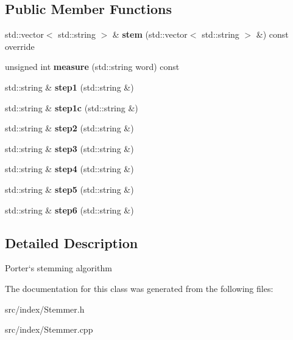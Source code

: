 \subsection*{Public Member Functions}
\begin{DoxyCompactItemize}
\item 
std\+::vector$<$ std\+::string $>$ \& {\bfseries stem} (std\+::vector$<$ std\+::string $>$ \&) const override\hypertarget{classStemmer_ae058747c8ba219324631ddd0e7258d9e}{}\label{classStemmer_ae058747c8ba219324631ddd0e7258d9e}

\item 
unsigned int {\bfseries measure} (std\+::string word) const \hypertarget{classStemmer_a221809125f65c5c3154fa4c482e39f9b}{}\label{classStemmer_a221809125f65c5c3154fa4c482e39f9b}

\item 
std\+::string \& {\bfseries step1} (std\+::string \&)\hypertarget{classStemmer_a8a77a75e099f66edcafbbdb6b6b824c4}{}\label{classStemmer_a8a77a75e099f66edcafbbdb6b6b824c4}

\item 
std\+::string \& {\bfseries step1c} (std\+::string \&)\hypertarget{classStemmer_a8b84eb574cf401df2530aab31b234b8b}{}\label{classStemmer_a8b84eb574cf401df2530aab31b234b8b}

\item 
std\+::string \& {\bfseries step2} (std\+::string \&)\hypertarget{classStemmer_ad68bf0a9c083172fc928598171eee393}{}\label{classStemmer_ad68bf0a9c083172fc928598171eee393}

\item 
std\+::string \& {\bfseries step3} (std\+::string \&)\hypertarget{classStemmer_a4dc45e7fd247a8490d2dbf7e31bc75f2}{}\label{classStemmer_a4dc45e7fd247a8490d2dbf7e31bc75f2}

\item 
std\+::string \& {\bfseries step4} (std\+::string \&)\hypertarget{classStemmer_a8e8eaaac711dd39e1b3caccd8bcdfd7b}{}\label{classStemmer_a8e8eaaac711dd39e1b3caccd8bcdfd7b}

\item 
std\+::string \& {\bfseries step5} (std\+::string \&)\hypertarget{classStemmer_a251f8e0b66f18f511d00e77963e0664f}{}\label{classStemmer_a251f8e0b66f18f511d00e77963e0664f}

\item 
std\+::string \& {\bfseries step6} (std\+::string \&)\hypertarget{classStemmer_a4b3dd324562043bc7654e46fcef8ae47}{}\label{classStemmer_a4b3dd324562043bc7654e46fcef8ae47}

\end{DoxyCompactItemize}


\subsection{Detailed Description}
Porter`s stemming algorithm 

The documentation for this class was generated from the following files\+:\begin{DoxyCompactItemize}
\item 
src/index/Stemmer.\+h\item 
src/index/Stemmer.\+cpp\end{DoxyCompactItemize}
